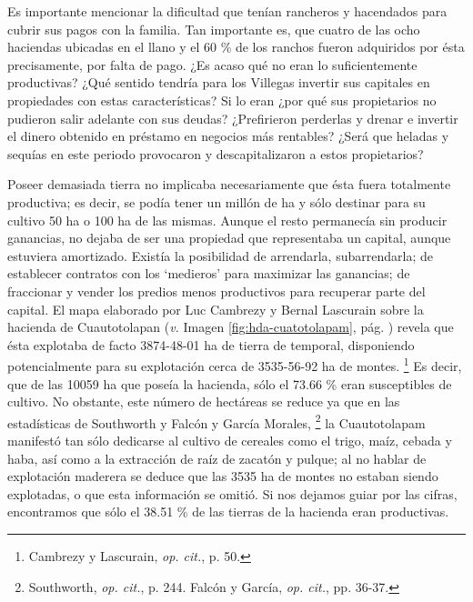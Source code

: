 \documentclass[14pt,twoside,final]{extbook} %
\let\oldfootnote\footnote
\renewcommand\footnote[1]{%
\oldfootnote{\hspace{1mm}#1}}
\begin{document}
Es importante mencionar la dificultad que tenían rancheros y hacendados para cubrir sus pagos con la familia. Tan importante es, que cuatro de las ocho haciendas ubicadas en el llano y el 60 \% de los ranchos fueron adquiridos por ésta precisamente, por falta de pago. ¿Es acaso qué no eran lo suficientemente productivas? ¿Qué sentido tendría para los Villegas invertir sus capitales en propiedades con estas características? Si lo eran ¿por qué sus propietarios no pudieron salir adelante con sus deudas? ¿Prefirieron perderlas y drenar e invertir el dinero obtenido en préstamo en negocios más rentables? ¿Será que heladas y sequías en este periodo provocaron y descapitalizaron a estos propietarios?

Poseer demasiada tierra no implicaba necesariamente que ésta fuera totalmente productiva; es decir, se podía tener un millón de ha y sólo destinar para su cultivo 50 ha o 100 ha de las mismas. Aunque el resto permanecía sin producir ganancias, no dejaba de ser una propiedad que representaba un capital, aunque estuviera amortizado. Existía la posibilidad de arrendarla, subarrendarla; de establecer contratos con los `medieros' para maximizar las ganancias; de fraccionar y vender los predios menos productivos para recuperar parte del capital. El mapa elaborado por Luc Cambrezy y Bernal Lascurain sobre la hacienda de Cuautotolapan (\emph{v.} Imagen \ref{fig:hda-cuatotolapam}, pág. \pageref{fig:hda-cuatotolapam}) revela que ésta explotaba de facto 3874-48-01 ha de tierra de temporal, disponiendo potencialmente para su explotación cerca de 3535-56-92 ha de montes.\footnote{Cambrezy y Lascurain, \emph{op. cit.}, p. 50.} Es decir, que de las 10059 ha que poseía la hacienda, sólo el 73.66 \% eran susceptibles de cultivo. No obstante, este número de hectáreas se reduce ya que en las estadísticas de Southworth y Falcón y García Morales,\footnote{Southworth, \emph{op. cit.}, p. 244. Falcón y García, \emph{op. cit.}, pp. 36-37.} la Cuautotolapam manifestó tan sólo dedicarse al cultivo de cereales como el trigo, maíz, cebada y haba, así como a la extracción de raíz de zacatón y pulque; al no hablar de explotación maderera se deduce que las 3535 ha de montes no estaban siendo explotadas, o que esta información se omitió. Si nos dejamos guiar por las cifras, encontramos que sólo el 38.51 \% de las tierras de la hacienda eran productivas.
\end{document}

